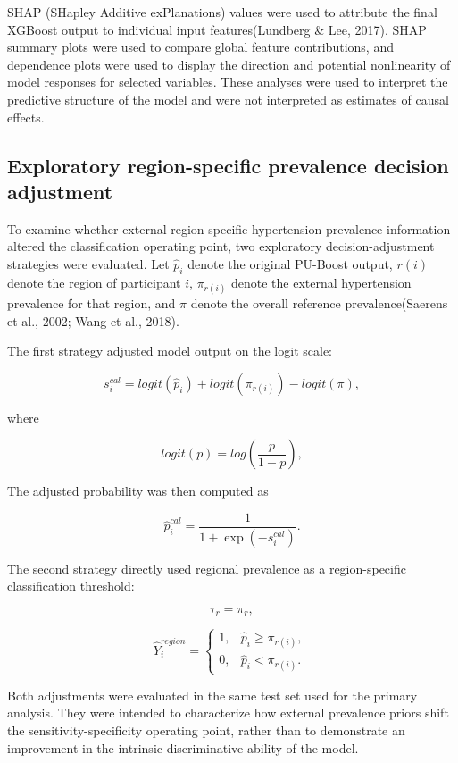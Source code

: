 \documentclass[10pt]{article}
\begin{document}
SHAP (SHapley Additive exPlanations) values were used to attribute the
final XGBoost output to individual input features(Lundberg \& Lee,
2017). SHAP summary plots were used to compare global feature
contributions, and dependence plots were used to display the direction
and potential nonlinearity of model responses for selected variables.
These analyses were used to interpret the predictive structure of the
model and were not interpreted as estimates of causal effects.

\subsection{Exploratory region-specific prevalence decision
adjustment}\label{exploratory-region-specific-prevalence-decision-adjustment}

To examine whether external region-specific hypertension prevalence
information altered the classification operating point, two exploratory
decision-adjustment strategies were evaluated. Let \({\widehat{p}}_{i}\)
denote the original PU-Boost output, \(r(i)\) denote the region of
participant \(i\), \(\pi_{r(i)}\) denote the external hypertension
prevalence for that region, and \(\pi\) denote the overall reference
prevalence(Saerens et al., 2002; Wang et al., 2018).

The first strategy adjusted model output on the logit scale:

\[s_{i}^{cal} = logit\left( {\widehat{p}}_{i} \right) + logit\left( \pi_{r(i)} \right) - logit(\pi),\]

where

\[logit(p) = log\left( \frac{p}{1 - p} \right),\]

The adjusted probability was then computed as

\[{\widehat{p}}_{i}^{cal} = \frac{1}{1 + \exp\left( - s_{i}^{cal} \right)}.\]

The second strategy directly used regional prevalence as a
region-specific classification threshold:

\[\tau_{r} = \pi_{r},\]

\[{\widehat{Y}}_{i}^{region} = \left\{ \begin{matrix}
1, & {\widehat{p}}_{i} \geq \pi_{r(i)}, \\
0, & {\widehat{p}}_{i} < \pi_{r(i)}.
\end{matrix} \right.\ \]

Both adjustments were evaluated in the same test set used for the
primary analysis. They were intended to characterize how external
prevalence priors shift the sensitivity-specificity operating point,
rather than to demonstrate an improvement in the intrinsic
discriminative ability of the model.
\end{document}
